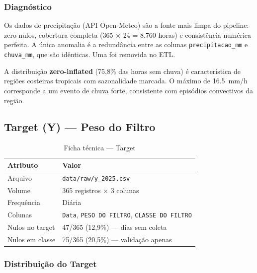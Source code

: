 \documentclass[12pt, a4paper]{article}
\newcommand{\feature}[1]{\texttt{#1}}
\newcommand{\arquivo}[1]{\texttt{#1}}
\begin{document}
\subsubsection{Diagnóstico}

Os dados de precipitação (API Open-Meteo) são a fonte mais limpa do
pipeline: zero nulos, cobertura completa (365 $\times$ 24 = 8.760 horas)
e consistência numérica perfeita. A única anomalia é a redundância entre
as colunas \feature{precipitacao\_mm} e \feature{chuva\_mm}, que são
idênticas. Uma foi removida no ETL.

A distribuição \textbf{zero-inflated} (75,8\% das horas sem chuva) é
característica de regiões costeiras tropicais com sazonalidade marcada.
O máximo de \SI{16,5}{\milli\metre/\hour} corresponde a um evento de chuva
forte, consistente com episódios convectivos da região.

\subsection{Target (Y) — Peso do Filtro}
\label{subsec:target}

\begin{table}[H]
\centering
\caption{Ficha técnica — Target}
\label{tab:target_ficha}
\begin{tabular}{@{}ll@{}}
\toprule
\textbf{Atributo}       & \textbf{Valor} \\
\midrule
Arquivo                  & \arquivo{data/raw/y\_2025.csv} \\
Volume                   & 365 registros $\times$ 3 colunas \\
Frequência               & Diária \\
Colunas                  & \feature{Data}, \feature{PESO DO FILTRO}, \feature{CLASSE DO FILTRO} \\
Nulos no target          & 47/365 (12,9\%) — dias sem coleta \\
Nulos em classe          & 75/365 (20,5\%) — validação apenas \\
\bottomrule
\end{tabular}
\end{table}

\subsubsection{Distribuição do Target}
\end{document}
